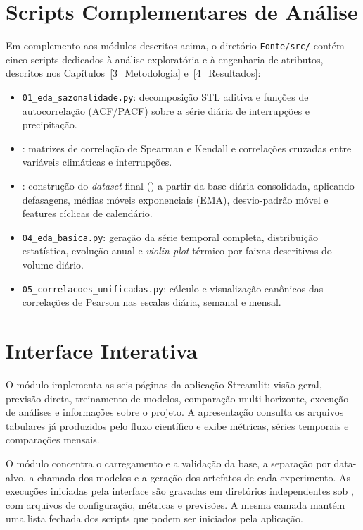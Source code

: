 \section{Scripts Complementares de Análise}
Em complemento aos módulos descritos acima, o diretório \texttt{Fonte/src/} contém cinco scripts dedicados à análise exploratória e à engenharia de atributos, descritos nos Capítulos~\ref{3_Metodologia} e~\ref{4_Resultados}:

\begin{itemize}
    \item \texttt{01\_eda\_sazonalidade.py}: decomposição STL aditiva e funções de autocorrelação (ACF/PACF) sobre a série diária de interrupções e precipitação.
    \item {}: matrizes de correlação de Spearman e Kendall e correlações cruzadas entre variáveis climáticas e interrupções.
    \item {}: construção do \textit{dataset} final () a partir da base diária consolidada, aplicando defasagens, médias móveis exponenciais (EMA), desvio-padrão móvel e features cíclicas de calendário.
    \item \texttt{04\_eda\_basica.py}: geração da série temporal completa, distribuição estatística, evolução anual e \textit{violin plot} térmico por faixas descritivas do volume diário.
    \item \texttt{05\_correlacoes\_unificadas.py}: cálculo e visualização canônicos das correlações de Pearson nas escalas diária, semanal e mensal.
\end{itemize}

\section{Interface Interativa}
O módulo  implementa as seis páginas da aplicação Streamlit: visão geral, previsão direta, treinamento de modelos, comparação multi-horizonte, execução de análises e informações sobre o projeto. A apresentação consulta os arquivos tabulares já produzidos pelo fluxo científico e exibe métricas, séries temporais e comparações mensais.

O módulo  concentra o carregamento e a validação da base, a separação por data-alvo, a chamada dos modelos e a geração dos artefatos de cada experimento. As execuções iniciadas pela interface são gravadas em diretórios independentes sob , com arquivos de configuração, métricas e previsões. A mesma camada mantém uma lista fechada dos scripts que podem ser iniciados pela aplicação.

